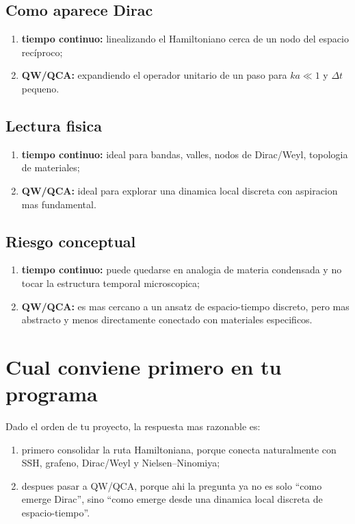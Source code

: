 \subsection{Como aparece Dirac}

\begin{enumerate}[leftmargin=*]
  \item \textbf{tiempo continuo:} linealizando el Hamiltoniano cerca de un nodo del espacio recíproco;
  \item \textbf{QW/QCA:} expandiendo el operador unitario de un paso para \(ka\ll 1\) y \(\Delta t\) pequeno.
\end{enumerate}

\subsection{Lectura fisica}

\begin{enumerate}[leftmargin=*]
  \item \textbf{tiempo continuo:} ideal para bandas, valles, nodos de Dirac/Weyl, topologia de materiales;
  \item \textbf{QW/QCA:} ideal para explorar una dinamica local discreta con aspiracion mas fundamental.
\end{enumerate}

\subsection{Riesgo conceptual}

\begin{enumerate}[leftmargin=*]
  \item \textbf{tiempo continuo:} puede quedarse en analogia de materia condensada y no tocar la estructura temporal microscopica;
  \item \textbf{QW/QCA:} es mas cercano a un ansatz de espacio-tiempo discreto, pero mas abstracto y menos directamente conectado con materiales especificos.
\end{enumerate}

\section{Cual conviene primero en tu programa}

Dado el orden de tu proyecto, la respuesta mas razonable es:

\begin{enumerate}[leftmargin=*]
  \item primero consolidar la ruta Hamiltoniana, porque conecta naturalmente con SSH, grafeno, Dirac/Weyl y Nielsen--Ninomiya;
  \item despues pasar a QW/QCA, porque ahi la pregunta ya no es solo \enquote{como emerge Dirac}, sino \enquote{como emerge desde una dinamica local discreta de espacio-tiempo}.
\end{enumerate}

